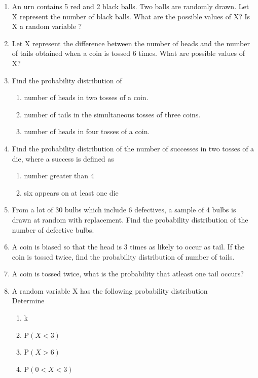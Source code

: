 \begin{enumerate}[label=\thechapter.\arabic*,ref=\thechapter.\theenumi]
\item An urn contains 5 red and 2 black balls. Two balls are randomly drawn. Let X
represent the number of black balls. What are the possible values of X? Is X a
random variable ? 
\
\item Let X represent the difference between the number of heads and the number of
tails obtained when a coin is tossed 6 times. What are possible values of X?

\item Find the probability distribution of
\begin{enumerate}
\item number of heads in two tosses of a coin.
\item number of tails in the simultaneous tosses of three coins.
\item number of heads in four tosses of a coin.
\end{enumerate}

\item Find the probability distribution of the number of successes in two tosses of a die,
where a success is defined as
\begin{enumerate}
\item number greater than 4
\item six appears on at least one die
\end{enumerate}
 

\item From a lot of 30 bulbs which include 6 defectives, a sample of 4 bulbs is drawn
at random with replacement. Find the probability distribution of the number of
defective bulbs.

\item A coin is biased so that the head is 3 times as likely to occur as tail. If the coin is
tossed twice, find the probability distribution of number of tails.
\item A coin is tossed twice, what is the probability that atleast one tail occurs?
\\
\solution

\item A random variable X has the following probability distribution\\

Determine

\begin{enumerate}
\begin{table}[ht!]\centering

\end{table}
\item k
\item P$(X < 3)$
\item P$(X > 6)$
\item P$(0 < X < 3)$


\end{enumerate}
\end{enumerate}
